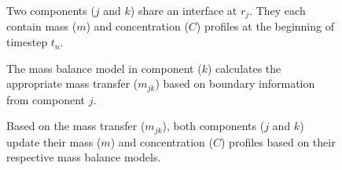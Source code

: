 

\begin{figure}[htbp!]
  \begin{center}
    \def\svgwidth{.4\textwidth}
    
  \end{center}
        \caption{Two components ($j$ and $k$) share an interface at $r_j$. They 
        each contain mass ($m$) and concentration ($C$) profiles at the 
        beginning of timestep $t_n$.}
  \label{fig:vols}
\end{figure}

\begin{figure}[htbp!]
  \begin{center}
    \def\svgwidth{.4\textwidth}
    
  \end{center}
        \caption{The mass balance model in component ($k$) calculates the appropriate
        mass transfer ($m_{jk}$) based on boundary information from component 
        $j$.}
  \label{fig:vols_trans}
\end{figure}

\begin{figure}[htbp!]
  \begin{center}
    \def\svgwidth{.4\textwidth}
    
  \end{center}
        \caption{Based on the mass transfer ($m_{jk}$), both components ($j$ 
        and $k$) update their mass ($m$) and concentration ($C$) profiles based 
        on their respective mass balance models.}
  \label{fig:vols_update}
\end{figure}

